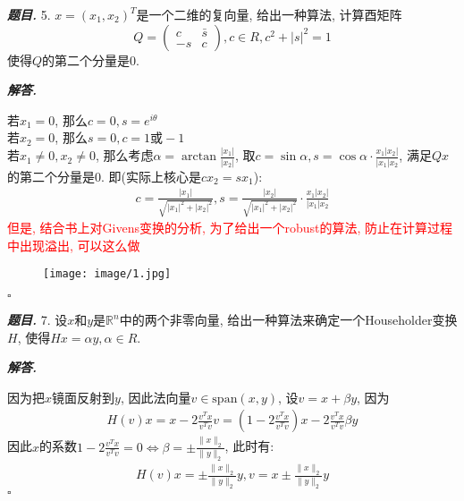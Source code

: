 \documentclass[10pt, a4paper, oneside]{ctexart}
\newcommand{\norm}[1]{\| #1 \|}
\newenvironment{problem}{\begin{framed}\par\noindent\textbf{\textit{题目. }}}{\end{framed}\par}
\newenvironment{solution}{%
  \par\noindent\textbf{\textit{解答. }}\ignorespaces
}{%
  \hfill\ensuremath{\square}\par %
}
\begin{document}
\begin{problem}
5. $x=(x_1,x_2)^T$是一个二维的复向量, 给出一种算法, 计算酉矩阵
$$Q=\begin{pmatrix}
    c&\bar{s}\\-s&c
\end{pmatrix}, c\in R,c^2+|s|^2=1$$
使得$Q$的第二个分量是$0$.
\end{problem}

\begin{solution}
若$x_1=0$, 那么$c=0, s=e^{i\theta}$\\
若$x_2=0$, 那么$s=0, c=1\text{或}-1$\\
若$x_1\neq 0,x_2\neq 0$, 那么考虑$\alpha=\arctan \frac{|x_1|}{|x_2|}$, 取$c=\sin \alpha, s=\cos \alpha \cdot \frac{x_1|x_2|}{|x_1|x_2}$, 满足$Qx$的第二个分量是$0$. 即(实际上核心是$cx_2=sx_1$):
\begin{align*}
    c = \frac{|x_1|}{\sqrt{|x_1|^2+|x_2|^2}}, s=\frac{|x_2|}{\sqrt{|x_1|^2+|x_2|^2}}\cdot\frac{x_1|x_2|}{|x_1|x_2}
\end{align*}
\textcolor{red}{但是, 结合书上对Givens变换的分析, 为了给出一个robust的算法, 防止在计算过程中出现溢出, 可以这么做}
\begin{figure}[h]
    \centering
    \texttt{[image: image/1.jpg]}
\end{figure}
\end{solution}
\newpage
\begin{problem}
7. 设$x$和$y$是$\mathbb{R}^n$中的两个非零向量, 给出一种算法来确定一个Householder变换$H$, 使得$Hx=\alpha y, \alpha\in R$.
\end{problem}
\begin{solution}
因为把$x$镜面反射到$y$, 因此法向量$v\in \text{span}(x,y)$, 设$v=x+\beta y$, 因为 
\begin{align*}
H(v)x=x-2\frac{v^Tx}{v^Tv}v=(1-2\frac{v^Tx}{v^Tv})x-2\frac{v^Tx}{v^Tv}\beta y
\end{align*}
因此$x$的系数$1-2\frac{v^Tx}{v^Tv}=0 \iff \beta=\pm \frac{\norm{x}_2}{\norm{y}_2}$, 此时有:
\begin{align*}
    H(v)x=\pm \frac{\norm{x}_2}{\norm{y}_2}y, v=x\pm \frac{\norm{x}_2}{\norm{y}_2}y
\end{align*}
\end{solution}
\end{document}
